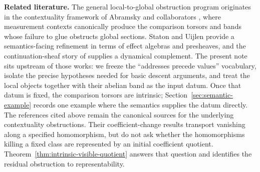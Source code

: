 \medskip
\noindent\textbf{Related literature.}
The general local-to-global obstruction program originates in the contextuality
framework of Abramsky and collaborators
\cite{AbramskyBrandenburger2011,Abramsky2014ContextualSemantics,AbramskyMansfieldBarbosa2012,AbramskyEtAl2015ContextualityCohomologyParadox},
where measurement contexts canonically produce the comparison torsors and bands
whose failure to glue obstructs global sections.  Staton and Uijlen
\cite{StatonUijlen2018EffectAlgebras} provide a semantics-facing refinement in
terms of effect algebras and presheaves, and the continuation-sheaf story of
\cite{DowlingKaliesVandervorst2023} supplies a dynamical complement.  The
present note sits upstream of those works: we freeze the ``addresses precede
values'' vocabulary, isolate the precise hypotheses needed for basic descent
arguments, and treat the local objects together with their abelian band as the
input datum.  Once that datum is fixed, the comparison torsors are intrinsic;
Section~\ref{sec:semantic-example} records one example where the semantics
supplies the datum directly.  The references cited above remain the canonical
sources for the underlying contextuality obstructions.  Their coefficient-change
results transport vanishing along a specified homomorphism, but do not ask
whether the homomorphisms killing a fixed class are represented by an initial
coefficient quotient.  Theorem~\ref{thm:intrinsic-visible-quotient} answers
that question and identifies the residual obstruction to representability.
